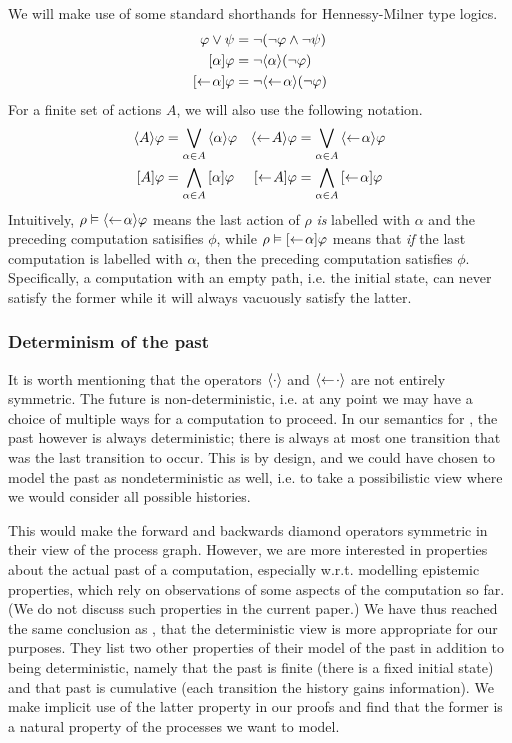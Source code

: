 We will make use of some standard shorthands for Hennessy-Milner type logics.
\begin{align*}
    \varphi \lor \psi &= \neg(\neg\varphi \land \neg\psi) \\
    \mbox{\ensuremath{[\alpha]}}\varphi &= \neg\mbox{\ensuremath{\langle \alpha \rangle}}(\neg\varphi) \\
    \mbox{\ensuremath{[\leftarrow\! \alpha]}}\varphi &= \neg\mbox{\ensuremath{\langle\leftarrow\! \alpha \rangle}}(\neg\varphi) \\
\end{align*}
For a finite set of actions $A$, we will also use the following notation.
\begin{align*}
    \mbox{\ensuremath{\langle A \rangle}}\varphi &= \bigvee_{\alpha\in A} \mbox{\ensuremath{\langle \alpha \rangle}} \varphi  &
    \mbox{\ensuremath{\langle\leftarrow\! A \rangle}}\varphi &= \bigvee_{\alpha\in A} \mbox{\ensuremath{\langle\leftarrow\! \alpha \rangle}} \varphi \\
    \mbox{\ensuremath{[A]}}\varphi &= \bigwedge_{\alpha\in A} \mbox{\ensuremath{[\alpha]}} \varphi  &
    \mbox{\ensuremath{[\leftarrow\! A]}}\varphi &= \bigwedge_{\alpha\in A} \mbox{\ensuremath{[\leftarrow\! \alpha]}} \varphi \\
\end{align*}
Intuitively, $\rho\vDash\mbox{\ensuremath{\langle\leftarrow\! \alpha \rangle}}\varphi$ means the last action of $\rho$
{\em is} labelled with $\alpha$ and the preceding computation satisifies $\phi$, while
$\rho\vDash\mbox{\ensuremath{[\leftarrow\! \alpha]}}\varphi$ means that {\em if} the last computation is labelled
with $\alpha$, then the preceding computation satisfies $\phi$. Specifically, a
computation with an empty path, i.e. the initial state, can never satisfy the former
while it will always vacuously satisfy the latter.

\subsubsection{Determinism of the past}
\label{sec:determinism_of_the_past}

It is worth mentioning that the operators $\mbox{\ensuremath{\langle \cdot \rangle}}$ and $\mbox{\ensuremath{\langle\leftarrow\! \cdot \rangle}}$ are
not entirely symmetric. The future is non-deterministic, i.e. at any point we may
have a choice of multiple ways for a computation to proceed. 
In our semantics for \HMLpast{}, the past however is
always deterministic; there is always at most one transition that was the last
transition to occur. This is by design, and we could have chosen to model the past
as nondeterministic as well, i.e. to take a possibilistic view where we would consider
all possible histories. 

This would make the forward and backwards diamond
operators symmetric in their view of the process graph. However, we are more
interested in properties about the actual past of a computation, especially
w.r.t. modelling epistemic properties, which rely on observations of some aspects
of the computation so far. (We do not discuss such properties in the
current paper.) We have thus reached the same conclusion as \cite{Laroussinie00},
that the deterministic view is more appropriate for our purposes. They list two other
properties of their model of the past in addition to being deterministic, namely that
the past is finite (there is a fixed initial state) and that past is cumulative (each
transition the history gains information). We make implicit use of the latter property 
in our proofs and find that the former is a natural property of the processes we
want to model.

